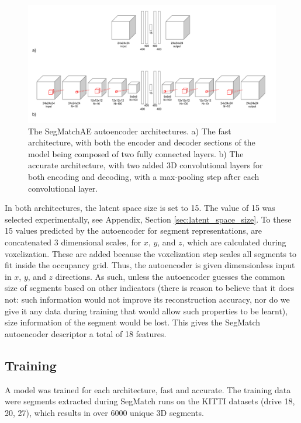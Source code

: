 \begin{figure}
  \centering
  \includegraphics[width=5.2in]{images/architecture.pdf}
  \caption{The SegMatchAE autoencoder architectures. a) The fast architecture, with both the encoder and decoder sections of the model being composed of two fully connected layers. b) The accurate architecture, with two added 3D convolutional layers for both encoding and decoding, with a max-pooling step after each convolutional layer.}
  \label{fig:architecture}
\end{figure}

In both architectures, the latent space size is set to 15. The value of 15 was selected experimentally, see Appendix, Section \ref{sec:latent_space_size}. To these 15 values predicted by the autoencoder for segment representations, are concatenated 3 dimensional scales, for $x$, $y$, and $z$, which are calculated during voxelization. These are added because the voxelization step scales all segments to fit inside the occupancy grid. Thus, the autoencoder is given dimensionless input in $x$, $y$, and $z$ directions. As such, unless the autoencoder guesses the common size of segments based on other indicators (there is reason to believe that it does not: such information would not improve its reconstruction accuracy, nor do we give it any data during training that would allow such properties to be learnt), size information of the segment would be lost. This gives the SegMatch autoencoder descriptor a total of 18 features.\\


\subsection{Training}
\label{subsec:ae-training}

A model was trained for each architecture, fast and accurate.  
The training data were segments extracted during SegMatch runs on the KITTI datasets (drive 18, 20, 27), which results in over 6000 unique 3D segments.\\

